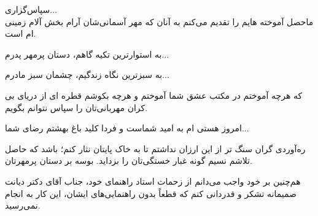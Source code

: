 %
%		


\newpage
{\nastaliq\LARGE
سپاس‌گزاری...
}
\\[2cm]
 ماحصل آموخته هایم را تقدیم می‌کنم به آنان که مهر آسمانی‌شان آرام بخش آلام زمینی ام است.
 
به استوارترین تکیه گاهم، دستان پرمهر پدرم...

به سبزترین نگاه زندگیم، چشمان سبز مادرم...

که هرچه آموختم در مکتب عشق شما آموختم و هرچه بکوشم قطره ای از دریای بی کران مهربانی‌تان را سپاس نتوانم بگویم.

امروز هستی ام به امید شماست و فردا کلید باغ بهشتم رضای شما...

ره‌آوردی گران سنگ تر از این ارزان نداشتم تا به خاک پایتان نثار کنم؛ باشد که حاصل تلاشم نسیم گونه غبار خستگی‌تان را بزداید. بوسه بر دستان پرمهرتان.

هم‌چنین بر خود واجب می‌دانم از زحمات استاد راهنمای خود، جناب آقای دکتر دیانت صمیمانه تشکر و  قدردانی کنم  که قطعاً بدون راهنمایی‌های‌ ایشان، این کار به انجام نمی‌رسید. 
